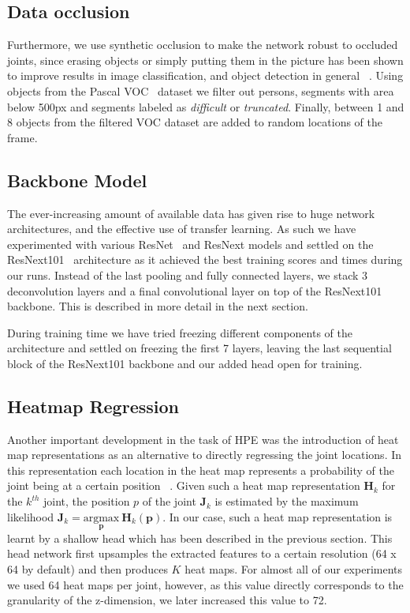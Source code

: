 \subsection{Data occlusion}

Furthermore, we use synthetic occlusion to make the network robust to occluded joints,
since erasing objects or simply putting them in the picture
has been shown to improve results in image classification, and object detection in general
~\cite{sarandi_synthetic_2018}.
Using objects from the Pascal VOC~\cite{Everingham2009ThePV} dataset we filter out persons,
segments with area below 500px and segments labeled as \emph{difficult} or \emph{truncated}.
Finally, between 1 and 8 objects from the filtered VOC dataset are added to random locations of the frame.

\subsection{Backbone Model}
The ever-increasing amount of available data has given rise to huge network architectures, and the effective
use of transfer learning.
As such we have experimented with various ResNet~\cite{DBLP:journals/corr/HeZRS15} and ResNext models and settled on
the ResNext101~\cite{DBLP:journals/corr/XieGDTH16} architecture as it achieved the best training scores and times during our runs.
Instead of the last pooling and fully connected layers, we stack 3 deconvolution
layers and a final convolutional layer on top of the ResNext101 backbone.
This is described in more detail in the next section.

During training time we have tried freezing different components of the architecture and settled on
freezing the first 7 layers, leaving the last sequential block of the ResNext101 backbone and our added head open for training.

\subsection{Heatmap Regression}

Another important development in the task of HPE was the introduction of heat map representations as an alternative to directly regressing the joint locations.
In this representation each location in the heat map represents a probability of the joint
being at a certain position ~\cite{sun_integral_2018-1}.
Given such a heat map representation $\mathbf{H}_k$ for the $k^{th}$ joint,
the position $p$ of the joint $\mathbf{J}_k$ is estimated by the maximum likelihood
$\mathbf{J}_k=\underset{\mathbf{p}}{\text{argmax}}\ \mathbf{H}_k(\mathbf{p})$.
In our case, such a heat map representation is learnt by a shallow head which has been described in the previous section.
This head network first upsamples the extracted features to a certain resolution (64 x 64 by default) and then produces $K$ heat maps.
For almost all of our experiments we used 64 heat maps per joint, however, as this value directly corresponds to the granularity of the z-dimension, we later increased this value to 72.

